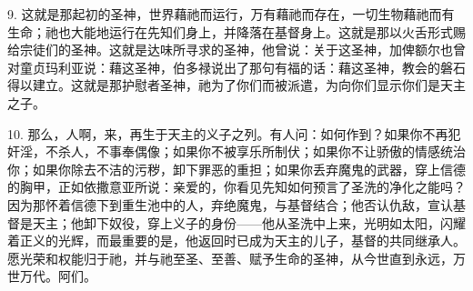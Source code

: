 9. 这就是那起初的圣神，\newline{}世界藉祂而运行，万有藉祂而存在，一切生物藉祂而有生命；\newline{}祂也大能地运行在先知们身上，并降落在基督身上。\newline{}这就是那以火舌形式赐给宗徒们的圣神。\newline{}这就是达味所寻求的圣神，他曾说：\newline{}关于这圣神，加俾额尔也曾对童贞玛利亚说：\newline{}藉这圣神，伯多禄说出了那句有福的话：\newline{}藉这圣神，教会的磐石得以建立。\newline{}这就是那护慰者圣神，祂为了你们而被派遣，为向你们显示你们是天主之子。\par

10. 那么，人啊，来，再生于天主的义子之列。\newline{}有人问：如何作到？\newline{}如果你不再犯奸淫，不杀人，不事奉偶像；如果你不被享乐所制伏；如果你不让骄傲的情感统治你；如果你除去不洁的污秽，卸下罪恶的重担；如果你丢弃魔鬼的武器，穿上信德的胸甲，正如依撒意亚所说：\newline{}亲爱的，你看见先知如何预言了圣洗的净化之能吗？\newline{}因为那怀着信德下到重生池中的人，弃绝魔鬼，与基督结合；他否认仇敌，宣认基督是天主；他卸下奴役，穿上义子的身份——他从圣洗中上来，光明如太阳，闪耀着正义的光辉，而最重要的是，他返回时已成为天主的儿子，基督的共同继承人。\newline{}愿光荣和权能归于祂，并与祂至圣、至善、赋予生命的圣神，从今世直到永远，万世万代。阿们。\par


